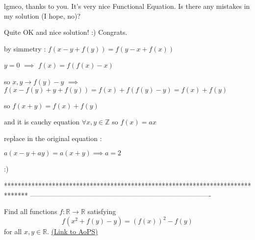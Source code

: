\begin{solution}
	\begin{tcolorbox}lgmco, thanks to you. It's very nice Functional Equation.
Is there any mistakes in my solution (I hope, no)?\end{tcolorbox}
Quite OK and nice solution!  :) 
Congrats.
\end{solution}



\begin{solution}
	by simmetry : $ f(x-y+f(y))=f(y-x+f(x))$

$ y=0$ $ \implies$ $ f(x)=f(f(x)-x)$

so $ x,y\rightarrow  f(y)-y$ $ \implies$ $ f(x-f(y)+y+f(y))=f(x)+f(f(y)-y)=f(x)+f(y)$

so $ f(x+y)=f(x)+f(y)$

and it is cauchy equation $ \forall x,y \in \mathbb{Z}$ so $ f(x)=ax$

replace in the original equation :

$ a(x-y+ay)=a(x+y)\implies a=2$

 :)
\end{solution}
*******************************************************************************
-------------------------------------------------------------------------------

\begin{problem}
	Find all functions $f: \mathbb R \to \mathbb R$ satisfying \[ f(x^2+f(y)-y)=(f(x))^2-f(y)\] for all $ x,y \in \mathbb R$.
	\flushright \href{https://artofproblemsolving.com/community/c6h298413}{(Link to AoPS)}
\end{problem}



